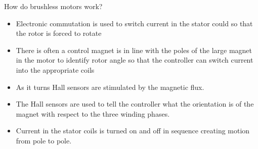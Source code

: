 \documentclass[compress]{beamer}
\begin{document}
\begin{frame}{How do brushless motors work?}

\begin{itemize}
\item Electronic commutation is used to switch current in the stator could
  so that the rotor is forced to rotate
\item There is often a control magnet is in line with the poles of the large
  magnet in the motor to identify rotor angle so that the controller can
  switch current into the appropriate coils
\item As it turns Hall sensors are stimulated by the magnetic flux.
\item The Hall sensors are used to tell the controller what the orientation
  is of the magnet with respect to the three winding phases.
\item Current in the stator coils is turned on and off in sequence creating
  motion from pole to pole.
\end{itemize}

\end{frame}
\end{document}
